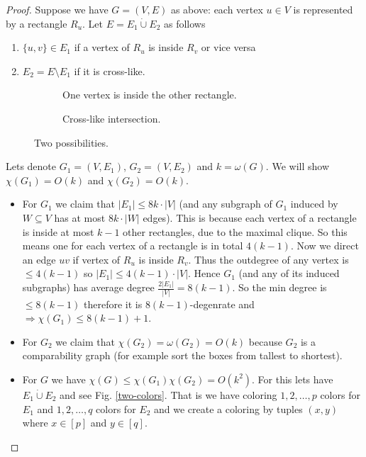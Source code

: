 \begin{proof}
	Suppose we have $G = (V,E)$ as above: each vertex $u \in V$ is represented by a rectangle $R_u$. Let $E = E_1 \dot{\cup} E_2$ as follows
	
	\begin{enumerate}
		\item $\{u,v\} \in E_1$ if a vertex of $R_u$ is inside $R_v$ or vice versa
		\item $E_2 = E \setminus E_1$ if it is cross-like.
	\end{enumerate}
	
	\begin{figure}[!ht]\centering
		\begin{subfigure}{.45\textwidth}\centering
			\caption{One vertex is inside the other rectangle.}
		\end{subfigure}
		\begin{subfigure}{.45\textwidth}\centering
			\caption{Cross-like intersection.}
		\end{subfigure}
		\caption{Two possibilities.}
	\end{figure}
	
	Lets denote $G_1 = (V, E_1)$, $G_2 = (V, E_2)$ and $k = \omega(G)$. We will show $\chi(G_1) = O(k)$ and $\chi(G_2) = O(k)$.
	
	\begin{itemize}
		\item For $G_1$ we claim that $|E_1| \leq 8 k \cdot |V|$ (and any subgraph of $G_1$ induced by $W \subseteq V$ has at most $8 k \cdot |W|$ edges). This is because each vertex of a rectangle is inside at most $k-1$ other rectangles, due to the maximal clique. So this means one for each vertex of a rectangle is in total $4 (k-1)$. Now we direct an edge $uv$ if vertex of $R_u$ is inside $R_v$. Thus the outdegree of any vertex is $\leq 4 (k-1)$ so $|E_1| \leq 4 (k-1) \cdot |V|$. Hence $G_1$ (and any of its induced subgraphs) has average degree $\frac{2 |E_1|}{|V|} = 8 (k-1)$. So the min degree is $\leq 8 (k-1)$ therefore it is $8(k-1)$-degenrate and $\Rightarrow \chi(G_1) \leq 8 (k-1) + 1$.
		\item For $G_2$ we claim that $\chi(G_2) = \omega(G_2) = O(k)$ because $G_2$ is a comparability graph (for example sort the boxes from tallest to shortest).
		\item For $G$ we have $\chi(G) \leq \chi(G_1) \chi(G_2) = O(k^2)$. For this lets have $E_1 \dot{\cup} E_2$ and see Fig. \ref{two-colors}. That is we have coloring $1,2, \dots, p$ colors for $E_1$ and $1,2, \dots, q$ colors for $E_2$ and we create a coloring by tuples $(x,y)$ where $x \in [p]$ and $y \in [q]$.
	\end{itemize}
	

\end{proof}
